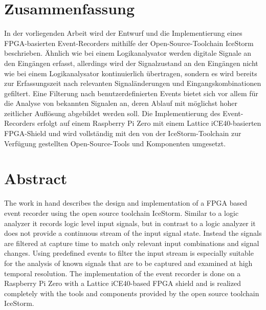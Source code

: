 \documentclass[oneside]{wissdoc}
\newcommand{\blankpage}{%
 \clearpage{\pagestyle{empty}\cleardoublepage}
}
\begin{document}



%

\section*{Zusammenfassung}

In der vorliegenden Arbeit wird der Entwurf und die Implementierung eines FPGA-basierten Event-Recorders mithilfe der Open-Source-Toolchain IceStorm beschrieben. Ähnlich wie bei einem Logikanalysator werden digitale Signale an den Eingängen erfasst, allerdings wird der Signalzustand an den Eingängen nicht wie bei einem Logikanalysator kontinuierlich übertragen, sondern es wird bereits zur Erfassungszeit nach relevanten Signaländerungen und Eingangskombinationen gefiltert. Eine Filterung nach benutzerdefinierten Events bietet sich vor allem für die Analyse von bekannten Signalen an, deren Ablauf mit möglichst hoher zeitlicher Auflösung abgebildet werden soll.
Die Implementierung des Event-Recorders erfolgt auf einem Raspberry Pi Zero mit einem Lattice iCE40-basierten FPGA-Shield und wird vollständig mit den von der IceStorm-Toolchain zur Verfügung gestellten Open-Source-Tools und Komponenten umgesetzt.   

\section*{Abstract}

The work in hand describes the design and implementation of a FPGA based event recorder using the open source toolchain IceStorm. 
Similar to a logic analyzer it records logic level input signals, but in contrast to a logic analyzer it does not provide a continuous stream of the input signal state. Instead the signals are filtered at capture time to match only relevant input combinations and signal changes. Using predefined events to filter the input stream is especially suitable for the analysis of known signals that are to be captured and examined at high temporal resolution.
The implementation of the event recorder is done on a Raspberry Pi Zero with a Lattice iCE40-based FPGA shield and is realized completely with the tools and components provided by the open source toolchain IceStorm.   


\ifnotdraft{
\tableofcontents
}
\end{document}
